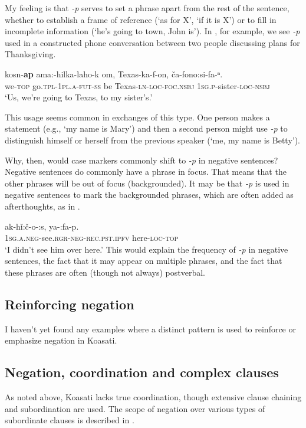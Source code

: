 \documentclass[output=paper,colorlinks,citecolor=brown]{langscibook}
\begin{document}
My feeling is that \textit{-p} serves to set a phrase apart from the rest of the sentence, whether to establish a frame of reference (‘as for X’, ‘if it is X’) or to fill in incomplete information (‘he’s going to town, John is’). In , for example, we see \textit{-p} used in a constructed phone conversation between two people discussing plans for Thanksgiving.

\ea\label{ex:koa:61}
    \gll kosn-\textbf{ap} ama:-hilka-laho-k om, Texas-ka-f-on, ča-fono:si-fa-ⁿ.\\ 
         we-\textsc{top}  go.\textsc{tpl}-1\textsc{pl.a}-\textsc{fut}-\textsc{ss} be Texas-\textsc{ln}-\textsc{loc}-\textsc{foc}.\textsc{nsbj}  1\textsc{sg.p}-sister-\textsc{loc}-\textsc{nsbj}\\
    \glt ‘Us, we’re going to Texas, to my sister’s.’
\z 
 
This usage seems common in exchanges of this type. One person makes a statement (e.g., ‘my name is Mary’) and then a second person might use \textit{-p} to distinguish himself or herself from the previous speaker (‘me, my name is Betty’).

Why, then, would case markers commonly shift to \textit{-p} in negative sentences? Negative sentences do commonly have a phrase in focus. That means that the other phrases will be out of focus (backgrounded). It may be that \textit{-p} is used in negative sentences to mark the backgrounded phrases, which are often added as afterthoughts, as in .

\ea\label{ex:koa:62}
    \gll ak-hǐ:č-o-:s,  ya-:fa-p. \\ 
         1\textsc{sg.a}.\textsc{neg}-see.\textsc{rgr}-\textsc{neg}-\textsc{rec.pst}.\textsc{ipfv}  here-\textsc{loc}-\textsc{top} \\
    \glt ‘I didn’t see him over here.’
\z 
This would explain the frequency of \textit{-p} in negative sentences, the fact that it may appear on multiple phrases, and the fact that these phrases are often (though not always) postverbal.

\subsection{Reinforcing negation}\label{sec:koa:4.4}

I haven’t yet found any examples where a distinct pattern is used to reinforce or emphasize negation in Koasati.

\subsection{Negation, coordination and complex clauses}\label{sec:koa:4.5}
As noted above, Koasati lacks true coordination, though extensive clause chaining and subordination are used. The scope of negation over various types of subordinate clauses is described in .
\end{document}
